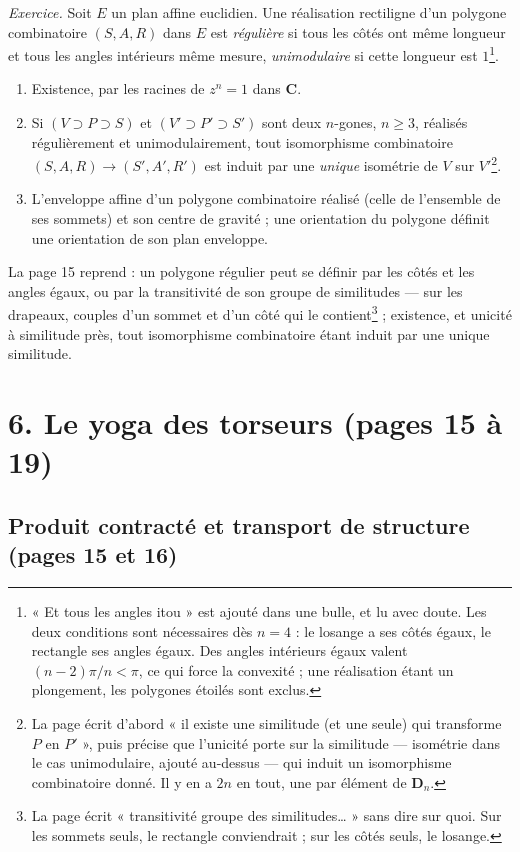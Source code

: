 \documentclass[11pt,a4paper]{article}
\begin{document}
\emph{Exercice.} Soit $E$ un plan affine euclidien. Une réalisation
rectiligne d'un polygone combinatoire $(S, A, R)$ dans $E$ est \emph{régulière}
si tous les côtés ont même longueur et tous les angles intérieurs même mesure,
\emph{unimodulaire} si cette longueur est $1$\footnote{« Et tous les angles
itou » est ajouté dans une bulle, et lu avec doute. Les deux conditions sont
nécessaires dès $n = 4$ : le losange a ses côtés égaux, le rectangle ses
angles égaux. Des angles intérieurs égaux valent $(n-2)\pi/n < \pi$, ce qui
force la convexité ; une réalisation étant un plongement, les polygones
étoilés sont exclus.}.
\begin{enumerate}
\item[a)] Existence, par les racines de $z^n = 1$ dans $\mathbf{C}$.
\item[b)] Si $(V \supset P \supset S)$ et $(V' \supset P' \supset S')$ sont deux
$n$-gones, $n \geq 3$, réalisés régulièrement et unimodulairement, tout
isomorphisme combinatoire $(S, A, R) \to (S', A', R')$ est induit par une
\emph{unique} isométrie de $V$ sur $V'$\footnote{La page écrit d'abord « il
existe une similitude (et une seule) qui transforme $P$ en $P'$ », puis
précise que l'unicité porte sur la similitude --- isométrie dans le cas
unimodulaire, ajouté au-dessus --- qui induit un isomorphisme combinatoire
donné. Il y en a $2n$ en tout, une par élément de $\mathbf{D}_n$.}.
\item[c)] L'enveloppe affine d'un polygone combinatoire réalisé (celle de
l'ensemble de ses sommets) et son centre de gravité ; une orientation du
polygone définit une orientation de son plan enveloppe.
\end{enumerate}
La page 15 reprend : un polygone régulier peut se définir par les côtés et
les angles égaux, ou par la transitivité de son groupe de similitudes ---
sur les drapeaux, couples d'un sommet et d'un côté qui le contient\footnote{La
page écrit « transitivité groupe des similitudes… » sans dire sur quoi. Sur
les sommets seuls, le rectangle conviendrait ; sur les côtés seuls, le
losange.} ; existence, et unicité à similitude près, tout isomorphisme
combinatoire étant induit par une unique similitude.

\section*{6. Le yoga des torseurs (pages 15 à 19)}

\subsection*{Produit contracté et transport de structure (pages 15 et 16)}
\end{document}

